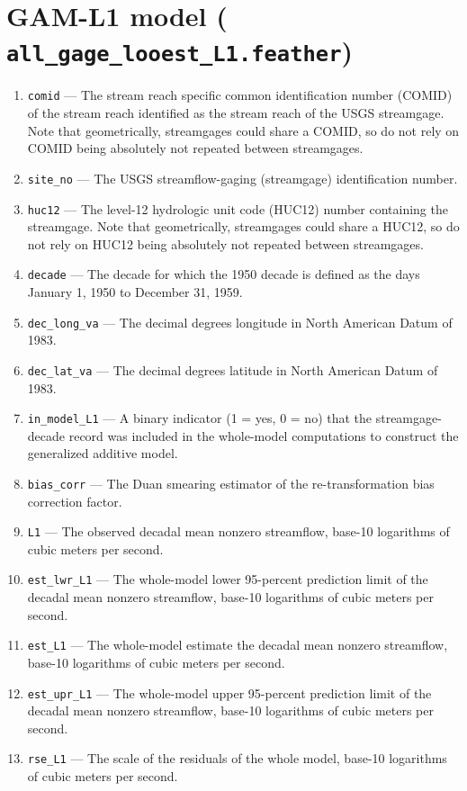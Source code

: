 \documentclass[1p, authoryear, 11pt, times, preprint]{elsarticle}
\newcommand{\code}[1]{{\color{black}%
                       \mbox{\lstinline[basicstyle={\small\ttfamily},
                                        keywordstyle=\scriptsize\ttfamily]|#1|}}}
\begin{document}
\section{GAM-L1 model (\code{all_gage_looest_L1.feather})}
\begin{enumerate}
\footnotesize
\RaggedRight
\item \code{comid} --- The stream reach specific common identification number (COMID) of the stream reach identified as the stream reach of the USGS streamgage. Note that geometrically, streamgages could share a COMID, so do not rely on COMID being absolutely not repeated between streamgages.
\item \code{site_no} --- The USGS streamflow-gaging (streamgage) identification number.
\item \code{huc12} --- The level-12 hydrologic unit code (HUC12) number containing the streamgage. Note that geometrically, streamgages could share a HUC12, so do not rely on HUC12 being absolutely not repeated between streamgages.
\item \code{decade} --- The decade for which the 1950 decade is defined as the days January 1, 1950 to December 31, 1959.
\item \code{dec_long_va} --- The decimal degrees longitude in North American Datum of 1983.
\item \code{dec_lat_va} --- The decimal degrees latitude in North American Datum of 1983.
\item \code{in_model_L1} --- A binary indicator (1 = yes, 0 = no) that the streamgage-decade record was included in the whole-model computations to construct the generalized additive model.
\item \code{bias_corr} --- The Duan smearing estimator of the re-transformation bias correction factor.
\item \code{L1} --- The observed decadal mean nonzero streamflow, base-10 logarithms of cubic meters per second.
\item \code{est_lwr_L1} --- The whole-model lower 95-percent prediction limit of the decadal mean nonzero streamflow, base-10 logarithms of cubic meters per second.
\item \code{est_L1} --- The whole-model estimate the decadal mean nonzero streamflow, base-10 logarithms of cubic meters per second.
\item \code{est_upr_L1} --- The whole-model upper 95-percent prediction limit of the decadal mean nonzero streamflow, base-10 logarithms of cubic meters per second.
\item \code{rse_L1} --- The scale of the residuals of the whole model, base-10 logarithms of cubic meters per second.

\end{enumerate}
\end{document}
